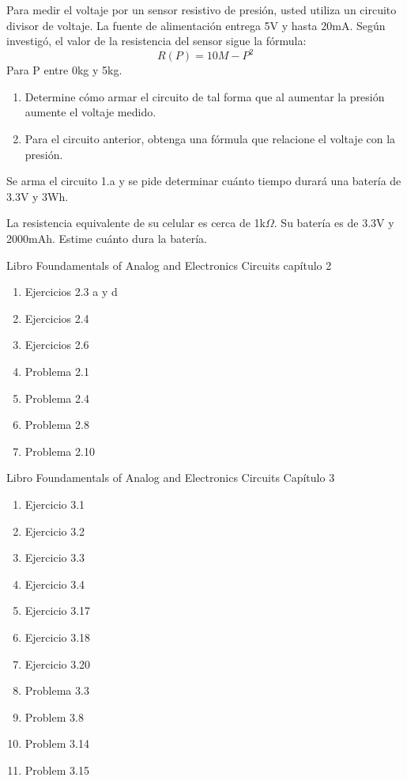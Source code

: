 \begin{problemset}
\begin{center}
\begin{circuitikz}[american]
    \end{circuitikz}
    \end{center}
\item Para medir el voltaje por un sensor resistivo de presión, usted utiliza un circuito divisor de voltaje.
La fuente de alimentación entrega 5V y hasta 20mA. Según investigó, el valor de la resistencia del sensor sigue la fórmula:
\begin{equation*}
    R(P)=10M-P^2
\end{equation*}
Para P entre 0kg y 5kg.
\begin{enumerate}
    \item Determine cómo armar el circuito de tal forma que al aumentar la presión aumente el voltaje medido.
    \item Para el circuito anterior, obtenga una fórmula que relacione el voltaje con la presión.
\end{enumerate}


\item Se arma el circuito 1.a y se pide determinar cuánto tiempo durará una batería de 3.3V y 3Wh.

\item La resistencia equivalente de su celular es cerca de 1k$\Omega$. Su batería es de 3.3V y 2000mAh. Estime cuánto dura la batería.

\item Libro Foundamentals of Analog and Electronics Circuits capítulo 2
\begin{enumerate}
    \item Ejercicios 2.3 a y d
    \item Ejercicios 2.4 
    \item Ejercicios 2.6
    \item Problema 2.1
    \item Problema 2.4
    \item Problema 2.8
    \item Problema 2.10
    
\end{enumerate}


\item Libro Foundamentals of Analog and Electronics Circuits Capítulo 3
\begin{enumerate}
    \item Ejercicio 3.1
    \item Ejercicio 3.2
    \item Ejercicio 3.3
    \item Ejercicio 3.4
    \item Ejercicio 3.17
    \item Ejercicio 3.18
    \item Ejercicio 3.20
     \item Problema 3.3
     \item Problem 3.8
     \item Problem 3.14
     \item Problem 3.15
\end{enumerate}


\end{problemset}
